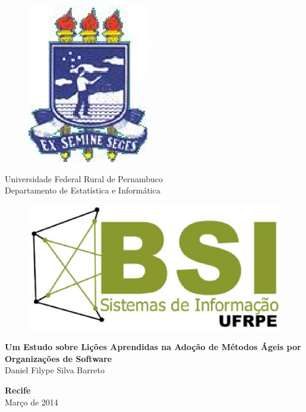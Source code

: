 \begin{figure}[h]
\leavevmode
\begin{minipage}{\textwidth}
\includegraphics[scale=0.7]
{prefacios/capa/logo-ufrpe.eps}
\end{minipage}
\end{figure}
\vspace{-3.5cm}
{\bf
\begin{center}
{\Large
\hspace*{0cm}Universidade Federal Rural de Pernambuco \\
\hspace*{0cm}Departamento de Estatística e Informática}\\
\end{center}
}
\noindent
\begin{figure}[h]
\centering
\includegraphics[scale=0.5]{prefacios/capa/logo-bsi-presencial-v3-amp.eps}
\end{figure}


\vspace{2.5cm}
\noindent
\begin{center}
{\Large \bf Um Estudo sobre Lições Aprendidas na Adoção de Métodos Ágeis por Organizações de Software} \\[5cm]
{\Large Daniel Filype Silva Barreto}\\[6mm]
\end{center}


\vspace{1.5cm}
\begin{center}
{\large {\bf Recife}\\[6mm]
Março de 2014}
\end{center}
\newpage
